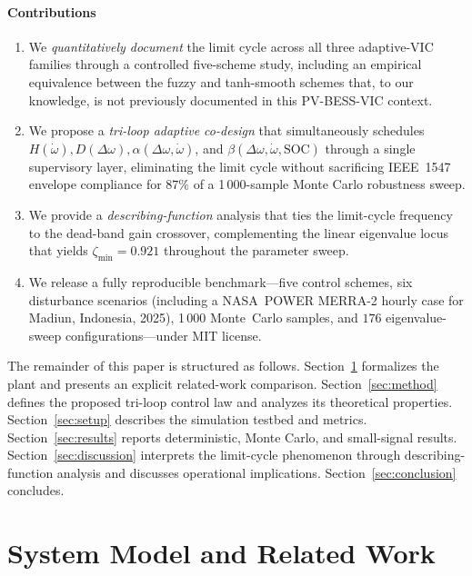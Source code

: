 \documentclass[journal]{IEEEtran}
\begin{document}
\paragraph*{Contributions}
\begin{enumerate}[leftmargin=*]
\item We \emph{quantitatively document} the limit cycle across all three
adaptive-VIC families through a controlled five-scheme study,
including an empirical equivalence between the fuzzy and tanh-smooth
schemes that, to our knowledge, is not previously documented in this
PV-BESS-VIC context.
\item We propose a \emph{tri-loop adaptive co-design} that
simultaneously schedules
$H(\dot\omega), D(\Delta\omega), \alpha(\Delta\omega,\dot\omega)$,
and $\beta(\Delta\omega,\dot\omega,\mathrm{SOC})$
through a single supervisory layer, eliminating the limit cycle
without sacrificing IEEE~1547 envelope compliance for $87\%$ of a
1\,000-sample Monte Carlo robustness sweep.
\item We provide a \emph{describing-function} analysis that ties the
limit-cycle frequency to the dead-band gain crossover, complementing
the linear eigenvalue locus that yields $\zeta_\mathrm{min}=0.921$
throughout the parameter sweep.
\item We release a fully reproducible benchmark---five control schemes,
six disturbance scenarios (including a NASA~POWER MERRA-2 hourly
case for Madiun, Indonesia, 2025), 1\,000 Monte~Carlo samples, and
$176$ eigenvalue-sweep configurations---under MIT license.
\end{enumerate}

The remainder of this paper is structured as follows.
Section~\ref{sec:model} formalizes the plant and presents an explicit
related-work comparison.
Section~\ref{sec:method} defines the proposed tri-loop control law and
analyzes its theoretical properties.
Section~\ref{sec:setup} describes the simulation testbed and metrics.
Section~\ref{sec:results} reports deterministic, Monte Carlo, and
small-signal results.
Section~\ref{sec:discussion} interprets the limit-cycle phenomenon
through describing-function analysis and discusses operational
implications.
Section~\ref{sec:conclusion} concludes.

\section{System Model and Related Work}\label{sec:model}
\end{document}
